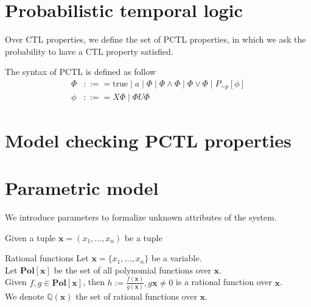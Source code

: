 \section{Probabilistic temporal logic}
Over CTL properties, we define the set of PCTL properties, in which we ask the probability to have a CTL property satisfied.
\begin{definition} The syntax of PCTL is defined as follow
    \begin{align*}
        \Phi & ::== \text{true} \;|\; a \;|\; \Phi \;|\; \Phi \wedge \Phi \;|\; \Phi \vee \Phi \;|\;  P_{\sim  p}[\phi] \\
        \phi & ::== X\Phi \;|\; \Phi U \Phi
    \end{align*}
\end{definition}

\section{Model checking PCTL properties}

\section{Parametric model}
We introduce parameters to formalize unknown attributes of the system.
\begin{definition}
    Given a tuple $\mathbf{x}=(x_1,\ldots,x_n)$ be a tuple
\end{definition}

\begin{definition}{Rational functions}
    Let $\mathbf{x}=\{x_1,\ldots,x_n\}$ be a variable.\\
    Let $\mathbf{Pol}[\mathbf{x}]$ be the set of all polynomial functions over $\mathbf{x}$.\\
    Given $f,g\in\mathbf{Pol}[\mathbf{x}]$, then $h:=\frac{f(\mathbf{x})}{g(\mathbf{x})}, g{\mathbf{x}}\neq 0$ is a rational function over $\mathbf{x}$.\\
    We denote $\mathbb{Q}(\mathbf{x})$ the set of rational functions over $\mathbf{x}$.
\end{definition}


